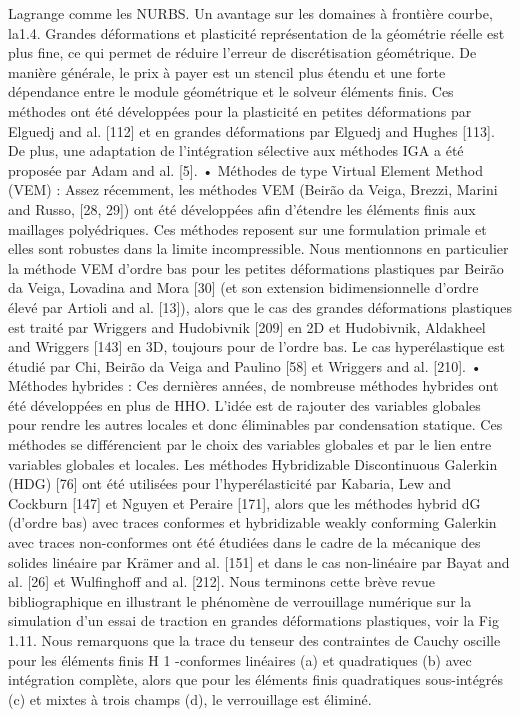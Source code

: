Lagrange comme les NURBS. Un avantage sur les domaines à frontière courbe, la1.4. Grandes déformations et plasticité
représentation de la géométrie réelle est plus fine, ce qui permet de réduire l’erreur de
discrétisation géométrique. De manière générale, le prix à payer est un stencil plus
étendu et une forte dépendance entre le module géométrique et le solveur éléments
finis. Ces méthodes ont été développées pour la plasticité en petites déformations par
Elguedj and al. [112] et en grandes déformations par Elguedj and Hughes [113]. De plus,
une adaptation de l’intégration sélective aux méthodes IGA a été proposée par Adam
and al. [5].
• Méthodes de type Virtual Element Method (VEM) : Assez récemment, les
méthodes VEM (Beirão da Veiga, Brezzi, Marini and Russo, [28, 29]) ont été développées
afin d’étendre les éléments finis aux maillages polyédriques. Ces méthodes reposent
sur une formulation primale et elles sont robustes dans la limite incompressible. Nous
mentionnons en particulier la méthode VEM d’ordre bas pour les petites déformations
plastiques par Beirão da Veiga, Lovadina and Mora [30] (et son extension bidimensionnelle
d’ordre élevé par Artioli and al. [13]), alors que le cas des grandes déformations plastiques
est traité par Wriggers and Hudobivnik [209] en 2D et Hudobivnik, Aldakheel and Wriggers
[143] en 3D, toujours pour de l’ordre bas. Le cas hyperélastique est étudié par Chi,
Beirão da Veiga and Paulino [58] et Wriggers and al. [210].
• Méthodes hybrides : Ces dernières années, de nombreuse méthodes hybrides ont
été développées en plus de HHO. L’idée est de rajouter des variables globales pour
rendre les autres locales et donc éliminables par condensation statique. Ces méthodes
se différencient par le choix des variables globales et par le lien entre variables globales et
locales. Les méthodes Hybridizable Discontinuous Galerkin (HDG) [76] ont été utilisées
pour l’hyperélasticité par Kabaria, Lew and Cockburn [147] et Nguyen et Peraire [171],
alors que les méthodes hybrid dG (d’ordre bas) avec traces conformes et hybridizable
weakly conforming Galerkin avec traces non-conformes ont été étudiées dans le cadre
de la mécanique des solides linéaire par Krämer and al. [151] et dans le cas non-linéaire
par Bayat and al. [26] et Wulfinghoff and al. [212].
Nous terminons cette brève revue bibliographique en illustrant le phénomène de verrouillage
numérique sur la simulation d’un essai de traction en grandes déformations plastiques, voir
la Fig 1.11. Nous remarquons que la trace du tenseur des contraintes de Cauchy oscille pour
les éléments finis H 1 -conformes linéaires (a) et quadratiques (b) avec intégration complète,
alors que pour les éléments finis quadratiques sous-intégrés (c) et mixtes à trois champs (d),
le verrouillage est éliminé.